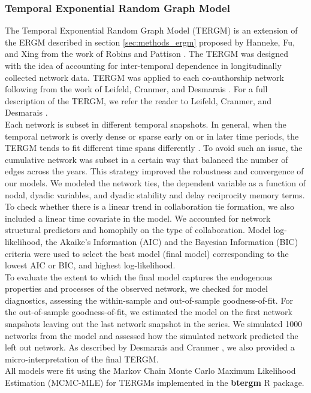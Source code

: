 \subsubsection{Temporal Exponential Random Graph Model}
\label{sec:methods_tergm}
The Temporal Exponential Random Graph Model (TERGM) is an extension of the ERGM described in section \ref{sec:methods_ergm} proposed by Hanneke, Fu, and Xing \cite{hanneke_discrete_2010} from the work of Robins and Pattison \cite{robins_random_2001}. The TERGM was designed with the idea of accounting for inter-temporal dependence in longitudinally collected network data. TERGM was applied to each co-authorship network following from the work of Leifeld, Cranmer, and Desmarais \cite{leifeld_temporal_2015}. For a full description of the TERGM, we refer the reader to Leifeld, Cranmer, and Desmarais \cite{leifeld_temporal_2015}. \\
Each network is subset in different temporal snapshots. In general, when the temporal network is overly dense or sparse early on or in later time periods, the TERGM tends to fit different time spans differently \cite{leifeld_temporal_2015}. To avoid such an issue, the cumulative network was subset in a certain way that balanced the number of edges across the years. This strategy improved the robustness and convergence of our models. We modeled the network ties, the dependent variable as a function of nodal, dyadic variables, and dyadic stability and delay reciprocity memory terms. To check whether there is a linear trend in collaboration tie formation, we also included a linear time covariate in the model. We accounted for network structural predictors and homophily on the type of collaboration.  Model log-likelihood, the Akaike's Information (AIC) and the Bayesian Information (BIC) criteria were used to select the best model (final model) corresponding to the lowest AIC or BIC, and highest log-likelihood. \\To evaluate the extent to which the final model captures the endogenous properties and processes of the observed network, we checked for model diagnostics, assessing the within-sample and out-of-sample goodness-of-fit. For the out-of-sample goodness-of-fit, we estimated the model on the first network snapshots leaving out the last network snapshot in the series. We simulated 1000 networks from the model and assessed how the simulated network predicted the left out network. As described by Desmarais and Cranmer \cite{desmarais_micro-level_2012}, we also provided a micro-interpretation of the final TERGM. \\
All models were fit using the Markov Chain Monte Carlo Maximum Likelihood Estimation (MCMC-MLE) for TERGMs implemented in the \textbf{btergm} R package.

